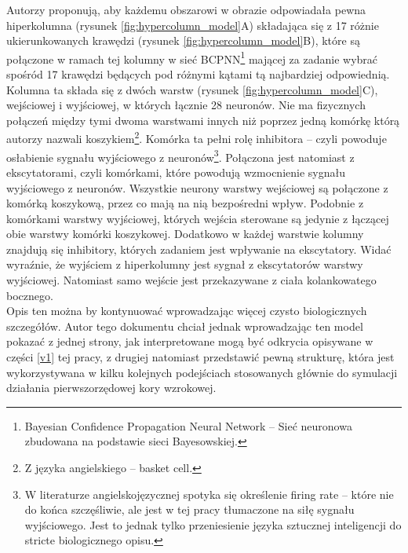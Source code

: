 Autorzy proponują, aby każdemu obszarowi w obrazie odpowiadała pewna hiperkolumna (rysunek \ref{fig:hypercolumn_model}A) składająca się z 17 różnie ukierunkowanych krawędzi (rysunek \ref{fig:hypercolumn_model}B), które są połączone w ramach tej kolumny w sieć BCPNN\footnote{Bayesian Confidence Propagation Neural Network -- Sieć neuronowa zbudowana na podstawie sieci Bayesowskiej.} mającej za zadanie wybrać spośród 17 krawędzi będących pod różnymi kątami tą najbardziej odpowiednią. Kolumna ta składa się z dwóch warstw (rysunek \ref{fig:hypercolumn_model}C), wejściowej i wyjściowej, w których łącznie 28 neuronów. Nie ma fizycznych połączeń między tymi dwoma warstwami innych niż poprzez jedną komórkę którą autorzy nazwali koszykiem\footnote{Z języka angielskiego -- basket cell.}. Komórka ta pełni rolę inhibitora -- czyli powoduje osłabienie sygnału wyjściowego z neuronów\footnote{W literaturze angielskojęzycznej spotyka się określenie firing rate -- które nie do końca szczęśliwie, ale jest w tej pracy tłumaczone na siłę sygnału wyjściowego. Jest to jednak tylko przeniesienie języka sztucznej inteligencji do stricte biologicznego opisu.}. Połączona jest natomiast z ekscytatorami, czyli komórkami, które powodują wzmocnienie sygnału wyjściowego z neuronów. Wszystkie neurony warstwy wejściowej są połączone z komórką koszykową, przez co mają na nią bezpośredni wpływ. Podobnie z komórkami warstwy wyjściowej, których wejścia sterowane są jedynie z łączącej obie warstwy komórki koszykowej. Dodatkowo w każdej warstwie kolumny znajdują się inhibitory, których zadaniem jest wpływanie na ekscytatory. Widać wyraźnie, że wyjściem z hiperkolumny jest sygnał z ekscytatorów warstwy wyjściowej. Natomiast samo wejście jest przekazywane z ciała kolankowatego bocznego.\\

Opis ten można by kontynuować wprowadzając więcej czysto biologicznych szczegółów. Autor tego dokumentu chciał jednak wprowadzając ten model pokazać z jednej strony, jak interpretowane mogą być odkrycia opisywane w części \ref{v1} tej pracy, z drugiej natomiast przedstawić pewną strukturę, która jest wykorzystywana w kilku kolejnych podejściach stosowanych głównie do symulacji działania pierwszorzędowej kory wzrokowej.


